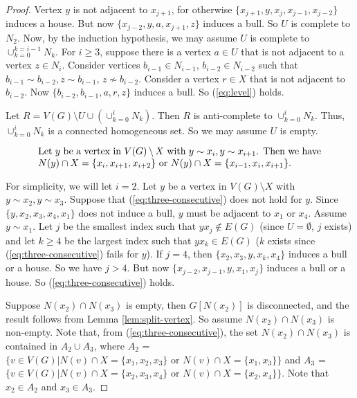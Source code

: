 \documentclass[10pt,a4paper]{amsart}
\begin{document}
\begin{proof}
Vertex $y$ is not adjacent to $x_{j+1}$, for otherwise $\{x_{j+1}, y, x_j, x_{j-1}, x_{j-2}  \}$ induces a house. But now $\{ x_{j-2}, y, a, x_{j+1}, z \}$ induces a bull. So $U$ is complete to $N_2$. Now, by the induction hypothesis, we may assume $U$ is complete to $\cup_{k=0}^{k=i-1} N_k$. For $i \geq 3$, suppose there is a vertex $a \in U$ that is not adjacent to a vertex $z \in N_i$. Consider vertices $b_{i-1} \in N_{i-1}$, $b_{i-2} \in N_{i-2}$ such that $b_{i-1} \sim b_{i-2}, z \sim b_{i-1}$, $z \not\sim b_{i-2}$. Consider a vertex $r \in X$ that is not adjacent to $b_{i-2}$. Now $\{b_{i-2}, b_{i-1}, a, r, z \}$ induces a bull. So (\ref{eq:level}) holds. 
    
    Let $R = V(G) \setminus U \cup (\cup_{k=0}^{i} N_k)$. Then $R$ is anti-complete to  $\cup_{k=0}^{i} N_k$. Thus, $\cup_{k=0}^{i} N_k$ is a connected homogeneous set. So we may assume $U$ is empty. 

    \begin{equation}\label{eq:three-consecutive}
	\text{\parbox{.85\textwidth}{Let $y$ be a vertex in $V(G) \setminus X$ with $y \sim x_i, y \sim x_{i+1}$. Then we have $N(y)\cap X = \{x_i,x_{i+1},x_{i+2}\}$ or $N(y) \cap X = \{x_{i-1}, x_i,x_{i+1}\}$.}}
    \end{equation}
   

 For simplicity, we will let $i=2$. Let $y$ be a vertex in $V(G) \setminus X$ with $y \sim x_2, y \sim x_{3}$.  Suppose that (\ref{eq:three-consecutive}) does not hold for $y$.
 Since $\{y,x_2, x_3, x_{4}, x_1\}$ does not induce a bull, $y$ must be adjacent to $x_1$ or $x_4$. Assume $y \sim x_{1}$. Let $j$ be the smallest index such that $yx_j\notin E(G)$ (since $U = \emptyset$, $j$ exists) and let $k \geq 4 $ be the largest index such that $y x_k\in E(G)$ ($k$ exists since (\ref{eq:three-consecutive}) fails for $y$). If $j = 4$, then $\{ x_2, x_3, y, x_k, x_4 \}$ induces a bull or a house. So we have $j > 4$. But now $\{ x_{j-2}  , x_{j-1} , y, x_1, x_j\}$ induces a bull or a house. So (\ref{eq:three-consecutive}) holds. 
 

Suppose $N(x_2)\cap N(x_3)$ is empty, then $G[N(x_2)]$ is disconnected, and the result follows from Lemma \ref{lem:split-vertex}. So assume $N(x_2)\cap N(x_3)$ is non-empty. Note that, from (\ref{eq:three-consecutive}), the set $N(x_2)\cap N(x_3)$ is contained in $A_2 \cup A_3$, where $A_2$ = $\{v\in V(G)| N(v)\cap X = \{x_1, x_2, x_3\} \text{ or } N(v)\cap X = \{x_1, x_3\} \}$ and $A_3$ = $\{v\in V(G)| N(v)\cap X = \{x_2, x_3, x_4\} \text{ or } N(v)\cap X = \{x_2, x_4\}\}$. Note that $x_2\in A_2$ and $x_3\in A_3$.
    

\end{proof}
\end{document}
